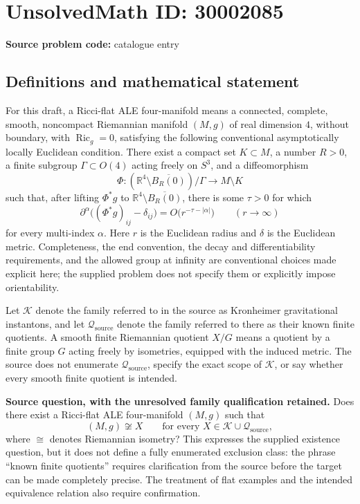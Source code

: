 \documentclass[11pt]{article}
\newcommand{\R}{\mathbb{R}}
\begin{document}
\section*{UnsolvedMath ID: 30002085}
\textbf{Source problem code:} catalogue entry
\subsection{Definitions and mathematical statement}
For this draft, a Ricci-flat ALE four-manifold means a connected, complete, smooth, noncompact Riemannian manifold $(M,g)$ of real dimension $4$, without boundary, with $\operatorname{Ric}_g=0$, satisfying the following conventional asymptotically locally Euclidean condition. There exist a compact set $K\subset M$, a number $R>0$, a finite subgroup $\Gamma\subset O(4)$ acting freely on $S^3$, and a diffeomorphism
\[
\Phi:(\R^4\setminus\overline{B_R(0)})/\Gamma\longrightarrow M\setminus K
\]
such that, after lifting $\Phi^*g$ to $\R^4\setminus\overline{B_R(0)}$, there is some $\tau>0$ for which
\[
\partial^\alpha\bigl((\Phi^*g)_{ij}-\delta_{ij}\bigr)
=O\bigl(r^{-\tau-|\alpha|}\bigr)
\qquad(r\to\infty)
\]
for every multi-index $\alpha$. Here $r$ is the Euclidean radius and $\delta$ is the Euclidean metric. Completeness, the end convention, the decay and differentiability requirements, and the allowed group at infinity are conventional choices made explicit here; the supplied problem does not specify them or explicitly impose orientability.

\medskip
Let $\mathcal K$ denote the family referred to in the source as Kronheimer gravitational instantons, and let $\mathcal Q_{\mathrm{source}}$ denote the family referred to there as their known finite quotients. A smooth finite Riemannian quotient $X/G$ means a quotient by a finite group $G$ acting freely by isometries, equipped with the induced metric. The source does not enumerate $\mathcal Q_{\mathrm{source}}$, specify the exact scope of $\mathcal K$, or say whether every smooth finite quotient is intended.

\textbf{Source question, with the unresolved family qualification retained.} Does there exist a Ricci-flat ALE four-manifold $(M,g)$ such that
\[
(M,g)\not\cong X
\qquad\text{for every }X\in\mathcal K\cup\mathcal Q_{\mathrm{source}},
\]
where $\cong$ denotes Riemannian isometry? This expresses the supplied existence question, but it does not define a fully enumerated exclusion class: the phrase ``known finite quotients'' requires clarification from the source before the target can be made completely precise. The treatment of flat examples and the intended equivalence relation also require confirmation.
\end{document}
